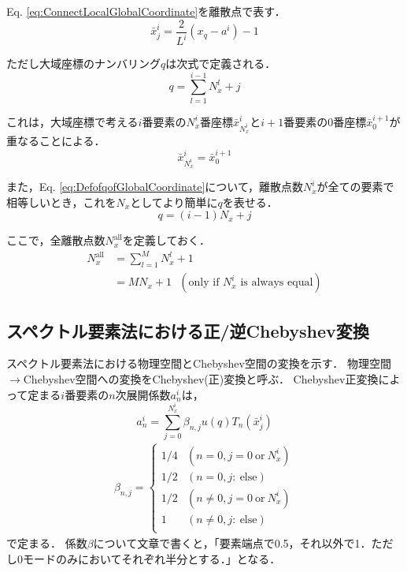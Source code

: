 \documentclass[12pt,a4paper]{jsarticle}
\begin{document}
Eq. \ref{eq:ConnectLocalGlobalCoordinate}を離散点で表す．
\begin{equation}
  \bar{x}_{j}^i = \frac{2}{L^i} (x_{q}-a^i) -1
  \label{eq:ConnectDiscreteLocalGlobalCoordinate}
\end{equation}

ただし大域座標のナンバリング$q$は次式で定義される．
\begin{equation}
  q = \sum_{l=1}^{i-1} N_{x}^{l} +j
  \label{eq:DefofqofGlobalCoordinate}
\end{equation}

これは，大域座標で考える$i$番要素の$N_{x}^i$番座標$\bar{x}_{N_{x}^i}^i$と$i+1$番要素の$0$番座標$\bar{x}_{0}^{i+1}$が重なることによる．
\begin{equation}
  \bar{x}_{N_{x}^i}^i = \bar{x}_{0}^{i+1}
  \label{eq:OverlapofElements}
\end{equation}

また，Eq. \ref{eq:DefofqofGlobalCoordinate}について，離散点数$N_{x}^i$が全ての要素で相等しいとき，これを$N_x$としてより簡単に$q$を表せる．
\begin{equation}
  q = (i-1) N_x +j
  \label{eq:DefofqofGlobalCoordinateSpecial}
\end{equation}

ここで，全離散点数$N_{x}^\text{all}$を定義しておく．
\begin{align}
  N_{x}^\text{all} &= \sum_{l=1}^{M} N_{x}^{l} +1 \\
                   &= M N_{x} +1 ~~~(\text{only if } N_{x}^i \text{ is always equal} )
\label{eq:DefofTotalInterpolantNumber}
\end{align}


\subsection{スペクトル要素法における正/逆Chebyshev変換}
\label{subsec:SpectralChebyshevTransform}

スペクトル要素法における物理空間とChebyshev空間の変換を示す．
物理空間$\rightarrow$Chebyshev空間への変換をChebyshev(正)変換と呼ぶ．
Chebyshev正変換によって定まる$i$番要素の$n$次展開係数$a_{n}^i$は，
\begin{equation}
  a_{n}^i = \sum_{j=0}^{N_{x}^i} \beta_{n,j} u(q) T_{n}(\bar{x}_{j}^i)
\label{eq:DefofPositiveChebyshev}
\end{equation}
\begin{align}
\beta_{n,j} =\left\{ \begin{array}{ll}
  1/4 & (n=0, j=0 ~\mathrm{or}~ N_{x}^i) \\
  1/2 & (n=0, j: ~\mathrm{else}) \\
  1/2 & (n \ne 0, j=0 ~\mathrm{or}~ N_{x}^i) \\
  1   & (n \ne 0, j: ~\mathrm{else}) \\
\end{array} \right.
\label{eq:DefofBeta}
\end{align}
で定まる．
係数$\beta$について文章で書くと，「要素端点で0.5，それ以外で1．ただし0モードのみにおいてそれぞれ半分とする．」となる．
\end{document}
